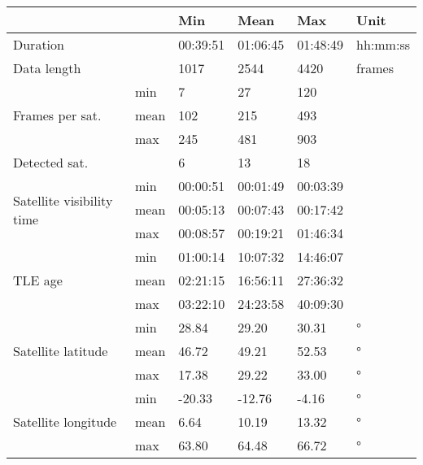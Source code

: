 \begin{table}
    \centering
    \begin{tabular}{p{1in}l|llll}
                                            &        & Min     & Mean    & Max     & Unit\\ \hline \hline
Duration                                    &        & 00:39:51 & 01:06:45 & 01:48:49 & hh:mm:ss     \\ 
Data length                                 &        & 1017 & 2544 & 4420 & frames     \\  \hline
\multirow{3}{1in}{Frames per sat.}              &  min   & 7 & 27 & 120 &      \\ 
                                            &  mean  & 102 & 215 & 493 &      \\ 
                                            &  max   & 245 & 481 & 903 &      \\  \hline
Detected sat.                         &        & 6 & 13 & 18 &      \\  \hline
\multirow{3}{1in}{Satellite visibility  time}   &  min   & 00:00:51 & 00:01:49 & 00:03:39 &      \\ 
                                            &  mean  & 00:05:13 & 00:07:43 & 00:17:42 &      \\ 
                                            &  max   & 00:08:57 & 00:19:21 & 01:46:34 &      \\  \hline
\multirow{3}{1in}{TLE age}                      &  min   & 01:00:14 & 10:07:32 & 14:46:07 &      \\ 
                                            &  mean  & 02:21:15 & 16:56:11 & 27:36:32 &      \\ 
                                            &  max   & 03:22:10 & 24:23:58 & 40:09:30 &      \\  \hline
\multirow{3}{1in}{Satellite latitude}           &  min   & 28.84 & 29.20 & 30.31 & °     \\ 
                                            &  mean  & 46.72 & 49.21 & 52.53 &  °    \\ 
                                            &  max   & 17.38 & 29.22 & 33.00 & °     \\  \hline
\multirow{3}{1in}{Satellite longitude}      &  min   & -20.33 & -12.76 & -4.16 & °     \\ 
                                            &  mean  & 6.64 & 10.19 & 13.32 &  °    \\ 
                                            &  max   & 63.80 & 64.48 & 66.72 & °     \\  \hline

\end{tabular}
\end{table}
